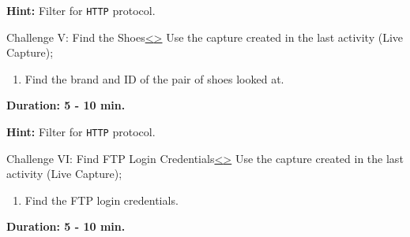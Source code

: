 \documentclass[12pt]{extarticle}
\newenvironment{instructionblock}{\Large\bgroup}{\egroup}
\begin{document}
	\noindent
	\textbf{Hint:} Filter for \texttt{HTTP} protocol.\\
	

	
	
	\pagebreak
	\begin{slide}{Challenge V: Find the Shoes}{\hyperref[slide 31]{\textless}\hyperref[slide 33]{\textgreater}}
		\vskip 5pt
		\begin{instructionblock}
			Use the capture created in the last activity (Live Capture);
			\begin{enumerate}
				\item Find the brand and ID of the pair of shoes looked at.
			\end{enumerate}
			
			\vspace{45mm}
			\begin{center}
				 \textbf{Duration: 5 - 10 min.}
			\end{center}
		\end{instructionblock}
	\end{slide}
	\vfill
	
	\noindent
	\textbf{Hint:} Filter for \texttt{HTTP} protocol.\\
	
	
	
	
	\pagebreak
	\begin{slide}{Challenge VI: Find FTP Login Credentials}{\hyperref[slide 32]{\textless}\hyperref[slide 34]{\textgreater}}
		\vskip 5pt
		\begin{instructionblock}
			Use the capture created in the last activity (Live Capture);
			\begin{enumerate}
				\item Find the FTP login credentials.
			\end{enumerate}
			
			\vspace{45mm}
			\begin{center}
				 \textbf{Duration: 5 - 10 min.}
			\end{center}
		\end{instructionblock}
	\end{slide}
	\vfill
	
\end{document}
